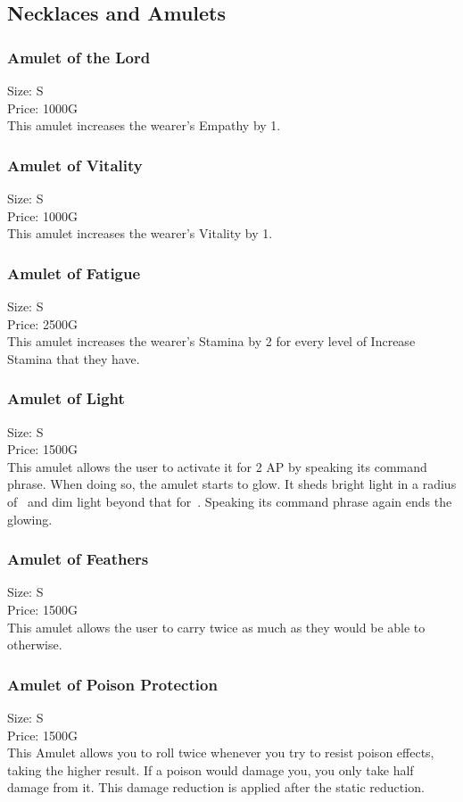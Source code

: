 \subsection{Necklaces and Amulets}\label{subsec:amulets}

\subsubsection{Amulet of the Lord}
Size: S\\
Price: 1000G\\
This amulet increases the wearer's Empathy by 1.

\subsubsection{Amulet of Vitality}
Size: S\\
Price: 1000G\\
This amulet increases the wearer's Vitality by 1.

\subsubsection{Amulet of Fatigue}
Size: S\\
Price: 2500G\\
This amulet increases the wearer's Stamina by 2 for every level of Increase Stamina that they have.

\subsubsection{Amulet of Light}
Size: S\\
Price: 1500G\\
This amulet allows the user to activate it for 2 AP by speaking its command phrase.
When doing so, the amulet starts to glow.
It sheds bright light in a radius of~ and dim light beyond that for~.
Speaking its command phrase again ends the glowing.

\subsubsection{Amulet of Feathers}
Size: S\\
Price: 1500G\\
This amulet allows the user to carry twice as much as they would be able to otherwise.

\subsubsection{Amulet of Poison Protection}
Size: S\\
Price: 1500G\\
This Amulet allows you to roll twice whenever you try to resist poison effects, taking the higher result.
If a poison would damage you, you only take half damage from it.
This damage reduction is applied after the static reduction.